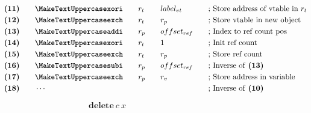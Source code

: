 \begin{figure}[H]
\begin{subfigure}[t]{0.495\linewidth}
{\begin{minipage}{\linewidth}
\begin{alignat*}{5}
                    &\textbf{(11)}\quad&&\inst{xori}\quad && r_t\quad && label_{vt} &&\text{; Store address of vtable in $r_t$}\\
                    &\textbf{(12)}\quad&&\inst{exch}\quad && r_t\quad && r_p\quad &&\text{; Store vtable in new object}\\
                    &\textbf{(13)}\quad&&\inst{addi}\quad && r_p\quad && offset_{ref}\quad &&\text{; Index to ref count pos}\\
                    &\textbf{(14)}\quad&&\inst{xori}\quad && r_t\quad && 1 &&\text{; Init ref count}\\
                    &\textbf{(15)}\quad&&\inst{exch}\quad && r_t\quad && r_p\quad &&\text{; Store ref count}\\
                    &\textbf{(16)}\quad&&\inst{subi}\quad && r_p\quad && offset_{ref}\quad &&\text{; Inverse of \textbf{(13)}}\\
                    &\textbf{(17)}\quad&&\inst{exch}\quad && r_p\quad && r_v\quad &&\text{; Store address in variable}\\
                    &\textbf{(18)}\quad&&\cdots\quad &&\quad && &&\text{; Inverse of \textbf{(10)}}\\
                \end{alignat*}
            \end{minipage}
        }
    \end{subfigure}
    \begin{subfigure}[t]{0.495\linewidth}
        \vskip 0pt
        \centering
        \begin{equation*}
            \textbf{delete}\ c\ x
        \end{equation*}
\end{subfigure}
\end{figure}
